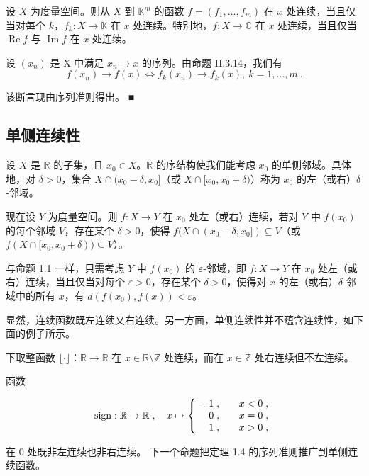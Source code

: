 \begin{proposition}

设 $X$ 为度量空间。则从 $X$ 到 $\mathbb{K}^m$ 的函数 $f = (f_1, \ldots, f_m)$ 在 $x$ 处连续，当且仅当对每个 $k$，$f_k: X \to \mathbb{K}$ 在 $x$ 处连续。特别地，$f: X \to \mathbb{C}$ 在 $x$ 处连续，当且仅当 $\operatorname{Re} f$ 与 $\operatorname{Im} f$ 在 $x$ 处连续。

\proofhead
设 $ (x_n) $ 是 X 中满足 $ x_n \to x $ 的序列。由命题 II.3.14，我们有
\[
f(x_{n})\to f(x)\iff f_{k}(x_{n})\to f_{k}(x),~k=1,\ldots,m~.
\]

该断言现由序列准则得出。 ■

\end{proposition}

\subsection*{单侧连续性}

设 $X$ 是 $\mathbb{R}$ 的子集，且 $x_0 \in X$。$\mathbb{R}$ 的序结构使我们能考虑 $x_0$ 的单侧邻域。具体地，对 $\delta > 0$，集合 $X \cap (x_0 - \delta, x_0]$（或 $X \cap [x_0, x_0 + \delta)$）称为 $x_0$ 的左（或右）$\delta$-邻域。

现在设 $Y$ 为度量空间。则 $f: X \to Y$ 在 $x_0$ 处左（或右）连续，若对 $Y$ 中 $f(x_0)$ 的每个邻域 $V$，存在某个 $\delta > 0$，使得 $f(X \cap (x_0 - \delta, x_0]) \subseteq V$（或 $f(X \cap [x_0, x_0 + \delta)) \subseteq V$）。

与命题 1.1 一样，只需考虑 $Y$ 中 $f(x_0)$ 的 $\varepsilon$-邻域，即 $f: X \to Y$ 在 $x_0$ 处左（或右）连续，当且仅当对每个 $\varepsilon > 0$，存在某个 $\delta > 0$，使得对 $x$ 的左（或右）$\delta$-邻域中的所有 $x$，有 $d(f(x_0), f(x)) < \varepsilon$。

显然，连续函数既左连续又右连续。另一方面，单侧连续性并不蕴含连续性，如下面的例子所示。

\begin{example}

\begin{items}
\item

下取整函数 $ \lfloor \cdot \rfloor $：$ \mathbb{R} \to \mathbb{R} $ 在 $ x \in \mathbb{R} \setminus \mathbb{Z} $ 处连续，而在 $ x \in \mathbb{Z} $ 处右连续但不左连续。

\item

函数

\begin{equation*}
\mathrm{s i g n}:\mathbb{R}\to\mathbb{R}\;,\quad x\mapsto\left\{\begin{array}{r l}{-1\;,}&{\quad x<0\;,}\\ {0\;,}&{\quad x=0\;,}\\ {1\;,}&{\quad x>0\;,}\\ \end{array}\right.
\end{equation*}

在 0 处既非左连续也非右连续。
下一个命题把定理 1.4 的序列准则推广到单侧连续函数。

\end{items}

\end{example}


